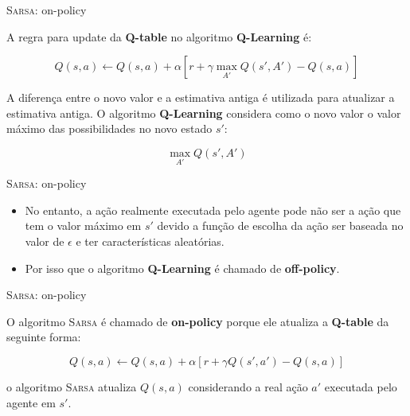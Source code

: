 \documentclass{beamer}
\begin{document}
\begin{frame}{\textsc{Sarsa}: on-policy}
	
	A regra para update da \textbf{Q-table} no algoritmo \textbf{Q-Learning} é: 
	
	\begin{equation}
	Q(s,a) \leftarrow Q(s,a) + \alpha [r +\gamma \max_{A'}{Q(s', A')} - Q(s,a)]
	\end{equation}

	A diferença entre o novo valor e a estimativa antiga é utilizada para atualizar a estimativa antiga. O algoritmo \textbf{Q-Learning} considera como o novo valor o valor máximo das possibilidades no novo estado $s'$: 
	
	\begin{equation}
	\max_{A'}{Q(s', A')}
	\end{equation}
	
\end{frame}


\begin{frame}{\textsc{Sarsa}: on-policy}
	
	\begin{itemize}
		
	\item No entanto, a ação realmente executada pelo agente pode não ser a ação que tem o valor máximo em $s'$ devido a função de escolha da ação ser baseada no valor de $\epsilon$ e ter características aleatórias.
	
	\item Por isso que o algoritmo \textbf{Q-Learning} é chamado de \textbf{off-policy}.   
\end{itemize}
	
\end{frame}


\begin{frame}{\textsc{Sarsa}: on-policy}
	
	O algoritmo \textsc{Sarsa} é chamado de  \textbf{on-policy} porque ele atualiza a \textbf{Q-table} da seguinte forma: 
	
	\begin{equation}
		Q(s,a) \leftarrow Q(s,a) + \alpha [r +\gamma Q(s', a') - Q(s,a)]
	\end{equation}
	
	o algoritmo \textsc{Sarsa} atualiza $Q(s,a)$ considerando a real ação $a'$ executada pelo agente em $s'$.
	
\end{frame}
\end{document}
